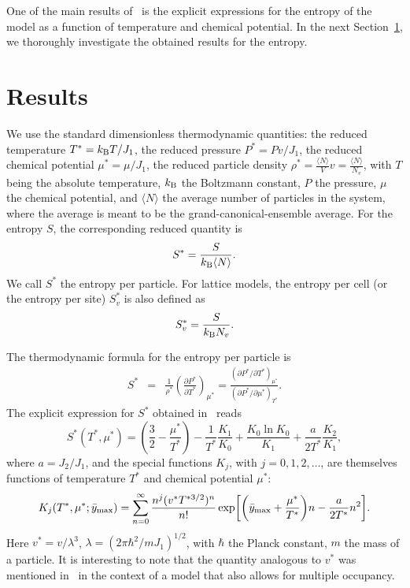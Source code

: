 \documentclass[entropy,article,submit,pdftex,moreauthors]{Definitions/mdpi}
\begin{document}
One of the main results of~\citep{RDKPS25arxiv} is the explicit expressions for the entropy of the model as a function of temperature and chemical potential. In the next Section~\ref{sec:res}, we thoroughly investigate the obtained results for the entropy. 



\section{Results}\label{sec:res}
We use the standard dimensionless thermodynamic quantities: the reduced temperature $T^*=k_{\rm B}T/J_1$, the reduced pressure $P^* = P v/J_1$, the reduced chemical potential $\mu^* = \mu/J_1$, the reduced particle density $\rho^* = \frac{\langle N \rangle}{V} v = \frac{\langle N \rangle}{N_v}$, with $T$ being the absolute temperature, $k_{\rm B}$ the Boltzmann constant, $P$ the pressure, $\mu$ the chemical potential, and $\langle N \rangle$ the average number of particles in the system, where the average is meant to be the grand-canonical-ensemble average. For the entropy $S$, the corresponding reduced quantity is
\begin{equation}
	\label{def:S1}
	S^* = \frac{S}{k_{\rm B} \langle N \rangle}.
\end{equation}
We call $S^*$ the entropy per particle. For lattice models, the entropy per cell (or the entropy per site) $S^*_v$ is also defined as
\begin{equation}
	\label{def:S2}
	S^*_v = \frac{S}{k_{\rm B} N_v}.
\end{equation}

The thermodynamic formula for the entropy per particle is
\begin{eqnarray}
	S^* & = & \frac{1}{\rho^*}\left(\frac{\partial P^*}{\partial T^*}\right)_{{\mu^*}}
	= \frac{(\partial P^* / \partial T^*)_{{\mu^*}}}{(\partial P^* / \partial \mu^*)_{T^*}}.
\end{eqnarray}
The explicit expression for $S^*$ obtained in~\citep{RDKPS25arxiv} reads
\begin{equation}
	\label{eq:entropy1}
	S^*(T^*,\mu^*) = \left(\frac{3}{2} - \frac{\mu^*}{T^*}\right) - \frac{1}{T^*}\frac{K_1}{K_0} + \frac{K_0 \ln K_0}{K_1} + \frac{a}{2T^*} \frac{K_2}{K_1},
\end{equation}
where $a = J_2/J_1$, and the special functions $K_j$, with $j=0, 1, 2, \ldots$, are themselves functions of temperature $T^*$ and chemical potential $\mu^*$:
\begin{equation}
	\label{def:Kj}
	K_j(T^*,\mu^*;\bar{y}_{\rm max}) = \sum_{n=0}^{\infty} \frac{n^j (v^* T^{*3/2})^n}{n!} \exp[\left(\bar{y}_{\rm max}+\frac{\mu^*}{T^*}\right)n - \frac{a}{2T^*}n^2].
\end{equation}
Here $v^* = v/\lambda^3$, $\lambda = (2\pi\hbar^2/mJ_1)^{1/2}$, with $\hbar$ the Planck constant, $m$ the mass of a particle. It is interesting to note that the quantity analogous to $v^*$ was mentioned in~\citep{PGT15} in the context of a model that also allows for multiple occupancy.
\end{document}
